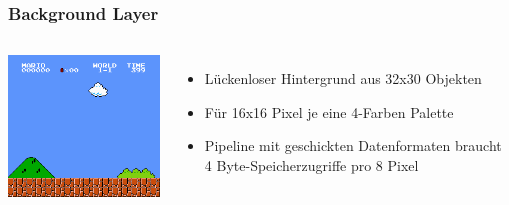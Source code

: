 \documentclass{beamer}
\begin{document}
    \begin{frame}
        \frametitle{Background Layer}
        \begin{columns}
                 \includegraphics[width=1.1\textwidth]{img/smb_bg.png}                
                \begin{itemize}
                       \item{Lückenloser Hintergrund aus 32x30 Objekten}
                       \item{Für 16x16 Pixel je eine 4-Farben Palette}
                        \item{Pipeline mit geschickten Datenformaten braucht 4 Byte-Speicherzugriffe pro 8 Pixel}
                \end{itemize}
        \end{columns}
    \end{frame}
    
\end{document}
